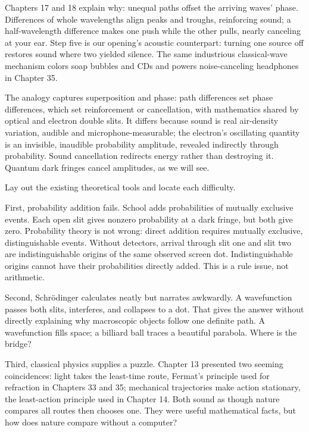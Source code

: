 Chapters 17 and 18 explain why: unequal paths offset the arriving waves' phase. Differences of whole wavelengths align peaks and troughs, reinforcing sound; a half-wavelength difference makes one push while the other pulls, nearly canceling at your ear. Step five is our opening's acoustic counterpart: turning one source off restores sound where two yielded silence. The same industrious classical-wave mechanism colors soap bubbles and CDs and powers noise-canceling headphones in Chapter 35.

The analogy captures superposition and phase: path differences set phase differences, which set reinforcement or cancellation, with mathematics shared by optical and electron double slits. It differs because sound is real air-density variation, audible and microphone-measurable; the electron's oscillating quantity is an invisible, inaudible probability amplitude, revealed indirectly through probability. Sound cancellation redirects energy rather than destroying it. Quantum dark fringes cancel amplitudes, as we will see.


Lay out the existing theoretical tools and locate each difficulty.

First, probability addition fails. School adds probabilities of mutually exclusive events. Each open slit gives nonzero probability at a dark fringe, but both give zero. Probability theory is not wrong: direct addition requires mutually exclusive, distinguishable events. Without detectors, arrival through slit one and slit two are indistinguishable origins of the same observed screen dot. Indistinguishable origins cannot have their probabilities directly added. This is a rule issue, not arithmetic.

Second, Schrödinger calculates neatly but narrates awkwardly. A wavefunction passes both slits, interferes, and collapses to a dot. That gives the answer without directly explaining why macroscopic objects follow one definite path. A wavefunction fills space; a billiard ball traces a beautiful parabola. Where is the bridge?

Third, classical physics supplies a puzzle. Chapter 13 presented two seeming coincidences: light takes the least-time route, Fermat's principle used for refraction in Chapters 33 and 35; mechanical trajectories make action stationary, the least-action principle used in Chapter 14. Both sound as though nature compares all routes then chooses one. They were useful mathematical facts, but how does nature compare without a computer?

